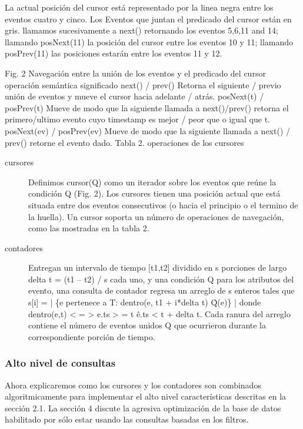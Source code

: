 \documentclass[12pt,legalpaper]{report}
\begin{document}
	

	La actual posición del cursor está representado por la linea negra entre los eventos cuatro y cinco.  Los Eventos que juntan el predicado del cursor están en gris.   llamamos sucesivamente a next() retornando los eventos 5,6,11 and 14;  llamando posNext(11) la posición del cursor entre los eventos 10 y 11; llamando posPrev(11) las posiciones estarán entre los eventos 11 y 12.

Fig. 2 Navegación entre la unión de los eventos y el predicado del cursor 
operación
semántica {significado}
next() / prev()
Retorna el siguiente / previo unión de eventos y mueve el cursor hacia adelante / atrás.
posNext(t) / posPrev(t)
Mueve de modo que la siguiente llamada a next()/prev() retorna el primero/ultimo evento cuyo timestamp es mejor / peor que o igual que t.
posNext(ev) / posPrev(ev)
Mueve de modo que la siguiente llamada a next() / prev() retorne el evento dado.
Tabla 2. operaciones de los cursores

\begin{description}
	\item[cursores] Definimos cursor(Q) como un iterador sobre los eventos que reúne la condición Q (Fig. 2).  Los cursores tienen una posición actual que está situada entre dos eventos consecutivos (o hacia el principio o el termino de la huella).  Un cursor soporta un número de operaciones de navegación, como las mostradas en la tabla 2.

	\item[contadores] Entregan un intervalo de tiempo [t1,t2] dividido en s porciones de largo delta t = (t1 – t2) / s cada uno, y una condición Q para los atributos del evento, una consulta de contador regresa un arreglo de s enteros tales que s[i] = | \{e pertenece a T: dentro(e, t1 + i*delta t) \^ Q(e)\} | donde dentro(e,t) < = > e.ts > = t \^ e.ts < t + delta t.   Cada ranura del arreglo contiene el número de eventos unidos Q que ocurrieron durante la correspondiente porción de tiempo.
\end{description}

			\subsubsection{Alto nivel de consultas}

	Ahora explicaremos como los cursores y los contadores son combinados algoritmicamente para implementar el alto nivel características descritas en la sección 2.1.  La sección 4 discute la agresiva optimización de la base de datos habilitado por sólo estar usando las consultas basadas en los filtros.
\end{document}
